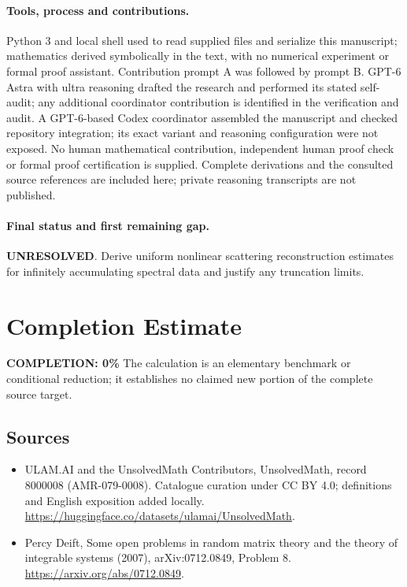 \documentclass[11pt]{article}
\begin{document}
\paragraph{Tools, process and contributions.}
Python 3 and local shell used to read supplied files and serialize this manuscript; mathematics derived symbolically in the text, with no numerical experiment or formal proof assistant. Contribution prompt A was followed by prompt B. GPT-6 Astra with ultra reasoning drafted the research and performed its stated self-audit; any additional coordinator contribution is identified in the verification and audit. A GPT-6-based Codex coordinator assembled the manuscript and checked repository integration; its exact variant and reasoning configuration were not exposed. No human mathematical contribution, independent human proof check or formal proof certification is supplied. Complete derivations and the consulted source references are included here; private reasoning transcripts are not published.

\paragraph{Final status and first remaining gap.}
\textbf{UNRESOLVED}. Derive uniform nonlinear scattering reconstruction estimates for infinitely accumulating spectral data and justify any truncation limits.

\section{Completion Estimate}
\noindent\textbf{COMPLETION: 0\%}
The calculation is an elementary benchmark or conditional reduction; it establishes no claimed new portion of the complete source target.

\subsection{Sources}
\begin{itemize}
\item[\hypertarget{source:8000008:1}{S1}] ULAM.AI and the UnsolvedMath Contributors, UnsolvedMath, record 8000008 (AMR-079-0008). Catalogue curation under CC BY 4.0; definitions and English exposition added locally.
\url{https://huggingface.co/datasets/ulamai/UnsolvedMath}.
\item[\hypertarget{source:8000008:2}{S2}] Percy Deift, Some open problems in random matrix theory and the theory of integrable systems (2007), arXiv:0712.0849, Problem 8.
\url{https://arxiv.org/abs/0712.0849}.
\end{itemize}
\label{end:8000008}
\end{document}

